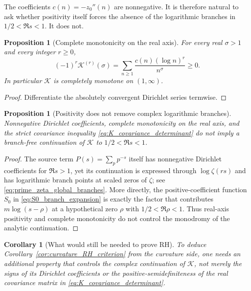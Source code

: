 \documentclass[11pt]{amsart}
\numberwithin{equation}{section}
\theoremstyle{plain}
\newtheorem{proposition}[theorem]{Proposition}
\newtheorem{corollary}[theorem]{Corollary}
\theoremstyle{definition}
\theoremstyle{remark}
\begin{document}
The coefficients \(c(n)=-z_0''(n)\) are nonnegative.  It is therefore
natural to ask whether positivity itself forces the absence of the logarithmic
branches in \(1/2<\Re s<1\).  It does not.

\begin{proposition}[Complete monotonicity on the real axis]
\label{prop:K_complete_monotone}
For every real \(\sigma>1\) and every integer \(r\ge0\),
\begin{equation}
\boxed{
(-1)^r\mathcal K^{(r)}(\sigma)
=\sum_{n\ge1}\frac{c(n)(\log n)^r}{n^\sigma}\ge0.}
\label{eq:K_complete_monotonicity}
\end{equation}
In particular \(\mathcal K\) is completely monotone on \((1,\infty)\).
\end{proposition}

\begin{proof}
Differentiate the absolutely convergent Dirichlet series termwise.
\end{proof}

\begin{proposition}[Positivity does not remove complex logarithmic branches]
\label{prop:positivity_not_enough}
Nonnegative Dirichlet coefficients, complete monotonicity on the real axis,
and the strict covariance inequality
\eqref{eq:K_covariance_determinant} do not imply a branch-free continuation
of \(\mathcal K\) to \(1/2<\Re s<1\).
\end{proposition}

\begin{proof}
The source term \(P(s)=\sum_p p^{-s}\) itself has nonnegative Dirichlet
coefficients for \(\Re s>1\), yet its continuation is expressed through
\(\log\zeta(rs)\) and has logarithmic branch points at scaled zeros of
\(\zeta\); see \eqref{eq:prime_zeta_global_branches}.  More directly, the
positive-coefficient function \(S_0\) in
\eqref{eq:S0_branch_expansion} is exactly the factor that contributes
\(m\log(s-\rho)\) at a hypothetical zero \(\rho\) with
\(1/2<\Re\rho<1\).  Thus real-axis positivity and complete monotonicity do not
control the monodromy of the analytic continuation.
\end{proof}

\begin{corollary}[What would still be needed to prove RH]
\label{cor:needed_for_RH}
To deduce Corollary~\ref{cor:curvature_RH_criterion} from the curvature side,
one needs an additional property that controls the complex continuation of
\(\mathcal K\), not merely the signs of its Dirichlet coefficients or the
positive-semidefiniteness of the real covariance matrix in
\eqref{eq:K_covariance_determinant}.
\end{corollary}
\end{document}
